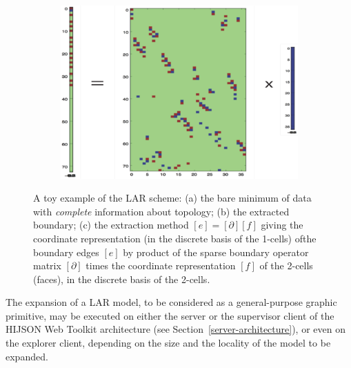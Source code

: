 \begin{figure}[!h]
\begin{subfigure}[b]{0.48\linewidth}
 \caption{}
 \vspace*{4mm}
 \end{subfigure}
\\
 \begin{subfigure}[b]{0.6\linewidth}
 \centering
 \includegraphics[width=\textwidth]{images/boundary}
 \caption{}
 \end{subfigure}
 
 \caption{A toy example of the LAR scheme: (a) the bare minimum of data with \emph{complete} information about topology; (b) the extracted boundary; (c) the extraction method $[e] = [\partial][f]$ giving the coordinate representation (in the discrete basis of the 1-cells) ofthe boundary edges $[e]$ by product of the sparse boundary operator matrix $[\partial]$ times the coordinate representation $[f]$ of the 2-cells (faces), in the discrete basis of the 2-cells.}
 \label{fig:minimum-data}
\end{figure}



The expansion of a LAR model, to be considered as a general-purpose graphic primitive, may be executed on either the server or the supervisor client of the HIJSON Web Toolkit architecture (see Section~\ref{server-architecture}), or even on the explorer client, depending on the size and the locality of the model to be expanded.


